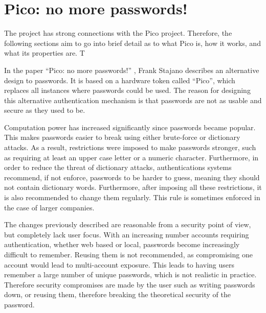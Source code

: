 
\chapter{Pico: no more passwords!} %

\label{Chapter2}


The project has strong connections with the Pico project. Therefore, the following sections aim to go into brief detail as to what Pico is, how it works, and what its properties are. T


In the paper ``Pico: no more passwords!'' \cite{stajano2011pico}, Frank Stajano describes an alternative design to passwords. It is based on a hardware token called ``Pico'', which replaces all instances where passwords could be used. The reason for designing this alternative authentication mechanism is that passwords are not as usable and secure as they used to be. 

Computation power has increased significantly since passwords became popular. This makes passwords easier to break using either brute-force or dictionary attacks. As a result, restrictions were imposed to make passwords stronger, such as requiring at least an upper case letter or a numeric character. Furthermore, in order to reduce the threat of dictionary attacks, authentications systems recommend, if not enforce, passwords to be harder to guess, meaning they should not contain dictionary words. Furthermore, after imposing all these restrictions, it is also recommended to change them regularly. This rule is sometimes enforced in the case of larger companies.

The changes previously described are reasonable from a security point of view, but completely lack user focus. With an increasing number accounts requiring authentication, whether web based or local, passwords become increasingly difficult to remember. Reusing them is not recommended, as compromising one account would lead to multi-account exposure. This leads to having users remember a large number of unique passwords, which is not realistic in practice. Therefore security compromises are made by the user such as writing passwords down, or reusing them, therefore breaking the theoretical security of the password.

